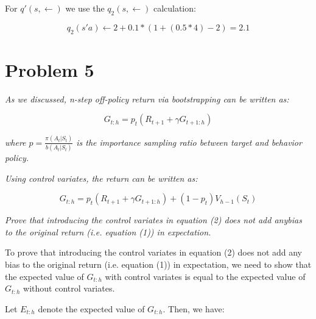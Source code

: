 \documentclass{article}
\begin{document}
For $q'(s,\leftarrow)$ we use the $q_2(s,\leftarrow)$ calculation:

\begin{equation}
    q_2(s'a) \leftarrow 2 + 0.1 * (1 + (0.5 * 4) - 2) = 2.1
\end{equation}


\section*{Problem 5}

\textit{As we discussed, n-step off-policy return via bootstrapping can be written as:}

\begin{equation}
    G_{t:h} = p_t(R_{t+1} + \gamma G_{t+1:h})
\end{equation}

\textit{where $p=\frac{\pi(A_t|S_t)}{b(A_t|S_t)}$ is the importance sampling ratio between target and behavior policy.}

\textit{Using control variates, the return can be written as:}

\begin{equation}
    G_{t:h} = p_t(R_{t+1}+\gamma G_{t+1:h}) + (1-p_t) V_{h-1} (S_t)
\end{equation}

\textit{Prove that introducing the control variates in equation (2) does not add anybias to the original return (i.e. equation (1)) in expectation.}


To prove that introducing the control variates in equation (2) does not add any bias to the original return (i.e. equation (1)) in expectation, we need to show that the expected value of $G_{t:h}$ with control variates is equal to the expected value of $G_{t:h}$ without control variates.

Let $E_{t:h}$ denote the expected value of $G_{t:h}$. Then, we have:
\end{document}
